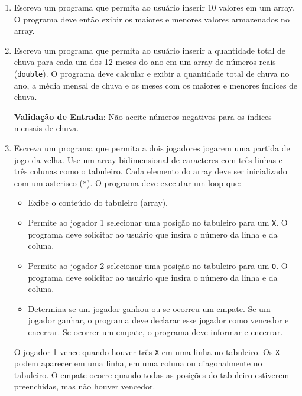 \documentclass[12pt]{article}
\begin{document}
\begin{enumerate}
\begin{enumerate}
\begin{verbatim}
      }
                  \end{verbatim}
            \end{enumerate}
      \item Escreva um programa que permita ao usuário inserir 10 valores em um array. O programa deve então exibir os maiores e menores valores armazenados no array.
      \item Escreva um programa que permita ao usuário inserir a quantidade total de chuva para cada um dos 12 meses do ano em um array de números reais (\texttt{double}). O programa deve calcular e exibir a quantidade total de chuva no ano, a média mensal de chuva e os meses com os maiores e menores índices de chuva.

            \textbf{Validação de Entrada}: Não aceite números negativos para os índices mensais de chuva.
      \item Escreva um programa que permita a dois jogadores jogarem uma partida de jogo da velha. Use um array bidimensional de caracteres com três linhas e três colunas como o tabuleiro. Cada elemento do array deve ser inicializado com um asterisco (\texttt{*}). O programa deve executar um loop que:
            \begin{itemize}
                  \item Exibe o conteúdo do tabuleiro (array).
                  \item Permite ao jogador 1 selecionar uma posição no tabuleiro para um \texttt{X}. O programa deve solicitar ao usuário que insira o número da linha e da coluna.
                  \item Permite ao jogador 2 selecionar uma posição no tabuleiro para um \texttt{O}. O programa deve solicitar ao usuário que insira o número da linha e da coluna.
                  \item Determina se um jogador ganhou ou se ocorreu um empate. Se um jogador ganhar, o programa deve declarar esse jogador como vencedor e encerrar. Se ocorrer um empate, o programa deve informar e encerrar.
            \end{itemize}

            O jogador 1 vence quando houver três \texttt{X} em uma linha no tabuleiro. Os \texttt{X} podem aparecer em uma linha, em uma coluna ou diagonalmente no tabuleiro. O empate ocorre quando todas as posições do tabuleiro estiverem preenchidas, mas não houver vencedor.


\end{enumerate}
\end{document}
